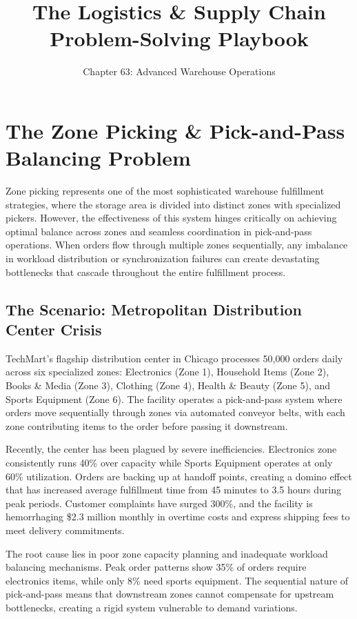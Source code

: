 \documentclass{article}
\title{The Logistics \& Supply Chain Problem-Solving Playbook}
\author{Chapter 63: Advanced Warehouse Operations}
\date{}
\begin{document}
\maketitle

\section{The Zone Picking \& Pick-and-Pass Balancing Problem}

Zone picking represents one of the most sophisticated warehouse fulfillment strategies, where the storage area is divided into distinct zones with specialized pickers. However, the effectiveness of this system hinges critically on achieving optimal balance across zones and seamless coordination in pick-and-pass operations. When orders flow through multiple zones sequentially, any imbalance in workload distribution or synchronization failures can create devastating bottlenecks that cascade throughout the entire fulfillment process.

\subsection{The Scenario: Metropolitan Distribution Center Crisis}

TechMart's flagship distribution center in Chicago processes 50,000 orders daily across six specialized zones: Electronics (Zone 1), Household Items (Zone 2), Books \& Media (Zone 3), Clothing (Zone 4), Health \& Beauty (Zone 5), and Sports Equipment (Zone 6). The facility operates a pick-and-pass system where orders move sequentially through zones via automated conveyor belts, with each zone contributing items to the order before passing it downstream.

Recently, the center has been plagued by severe inefficiencies. Electronics zone consistently runs 40\% over capacity while Sports Equipment operates at only 60\% utilization. Orders are backing up at handoff points, creating a domino effect that has increased average fulfillment time from 45 minutes to 3.5 hours during peak periods. Customer complaints have surged 300\%, and the facility is hemorrhaging \$2.3 million monthly in overtime costs and express shipping fees to meet delivery commitments.

The root cause lies in poor zone capacity planning and inadequate workload balancing mechanisms. Peak order patterns show 35\% of orders require electronics items, while only 8\% need sports equipment. The sequential nature of pick-and-pass means that downstream zones cannot compensate for upstream bottlenecks, creating a rigid system vulnerable to demand variations.
\end{document}
